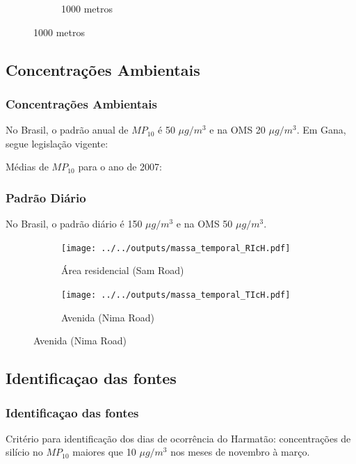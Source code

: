 \begin{frame}
\begin{figure}[H]
\begin{subfigure}[b]{0.5\linewidth}
    \caption{1000 metros}
  \end{subfigure}
\end{figure}
\end{frame}

\subsection{Concentrações Ambientais}
\begin{frame}
  \frametitle{Concentrações Ambientais}
  No Brasil, o padrão anual de $MP_{10}$ é 50 $\mu g/m^3$ e na OMS 20 $\mu g/m^3$. Em Gana, segue legislação vigente:
  \begin{table}[H]
  \centering
  \tiny 
    
  \end{table}
%    
Médias de $MP_{10}$ para o ano de 2007:
  \begin{table}[H]
    \centering
    \tiny 
    
  \end{table}
\end{frame}

\begin{frame}
  \frametitle{Padrão Diário}
    No Brasil, o padrão diário é
    150 $\mu g/m^3$ e na OMS 50 $\mu g/m^3$.
  \begin{figure}[H]
    \centering
    \begin{subfigure}[b]{0.45\textwidth}
      \texttt{[image: ../../outputs/massa\_temporal\_RIcH.pdf]}
      \caption{Área residencial (Sam Road)}
    \end{subfigure}%
    \begin{subfigure}[b]{0.45\textwidth}
      \texttt{[image: ../../outputs/massa\_temporal\_TIcH.pdf]}
      \caption{Avenida (Nima Road)}
    \end{subfigure}
  \end{figure}
\end{frame}

\subsection{Identificaçao das fontes}
\begin{frame}
  \frametitle{Identificaçao das fontes}
  
\begin{tcolorbox}[colback=blue!5,colframe=blue!40!black,title=Harmatão]
  Critério para identificação dos dias de ocorrência do Harmatão:
  concentrações de silício no $MP_{10}$ maiores que 10 $\mu g/m^3$ nos  meses de novembro à março. 
\end{tcolorbox}
\end{frame}

